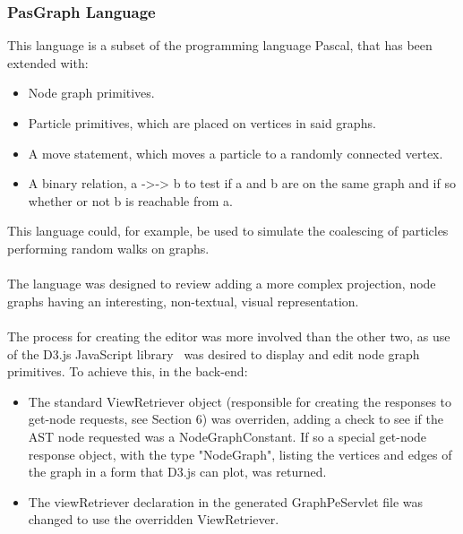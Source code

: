 \documentclass{article}
\begin{document}
{%



\subsubsection{PasGraph Language}\label{pasgraph}
This language is a subset of the programming language Pascal, that has been extended with: 
\begin{itemize}
\item Node graph primitives.
\item Particle primitives, which are placed on vertices in said graphs.
\item A move statement, which moves a particle to a randomly connected vertex.
\item A binary relation, a ->-> b to test if a and b are on the same graph and if so whether or not b is reachable from a.
\end{itemize}
This language could, for example, be used to simulate the coalescing of particles performing random walks on graphs. 
\\
\\
The language was designed to review adding a more complex projection, node graphs having an interesting, non-textual, visual representation.
\\
\\
The process for creating the editor was more involved than the other two, as use of the D3.js JavaScript library~\cite{d3} was desired to display and edit node graph primitives. To achieve this, in the back-end:
\begin{itemize}
\item The standard ViewRetriever object (responsible for creating the responses to get-node requests, see Section 6) was overriden, adding a check to see if the AST node requested was a NodeGraphConstant. If so a special get-node response object, with the type "NodeGraph", listing the vertices and edges of the graph in a form that D3.js can plot, was returned. 
\item The viewRetriever declaration in the generated GraphPeServlet file was changed to use the overridden ViewRetriever.

\end{itemize}}
\end{document}
